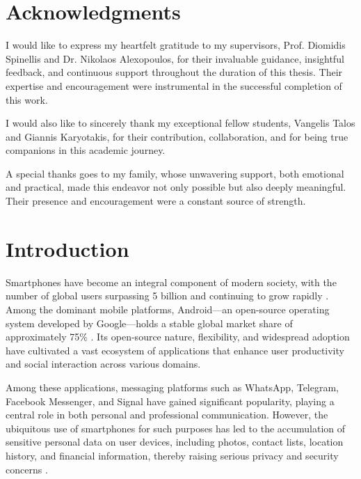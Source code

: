 \documentclass[a4paper,12pt]{report}
\begin{document}
\chapter*{Acknowledgments}

I would like to express my heartfelt gratitude to my supervisors, Prof. Diomidis Spinellis and Dr. Nikolaos Alexopoulos, for their invaluable guidance, insightful feedback, and continuous support throughout the duration of this thesis. Their expertise and encouragement were instrumental in the successful completion of this work.

I would also like to sincerely thank my exceptional fellow students, Vangelis Talos and Giannis Karyotakis, for their contribution, collaboration, and for being true companions in this academic journey.

A special thanks goes to my family, whose unwavering support, both emotional and practical, made this endeavor not only possible but also deeply meaningful. Their presence and encouragement were a constant source of strength.
\clearpage

\tableofcontents
\clearpage

\chapter{Introduction}

Smartphones have become an integral component of modern society, with the number of global users surpassing 5 billion and continuing to grow rapidly \cite{statista2024smartphone}. Among the dominant mobile platforms, Android—an open-source operating system developed by Google—holds a stable global market share of approximately 75\% \cite{statista2021android}. Its open-source nature, flexibility, and widespread adoption have cultivated a vast ecosystem of applications that enhance user productivity and social interaction across various domains.

Among these applications, messaging platforms such as WhatsApp, Telegram, Facebook Messenger, and Signal have gained significant popularity, playing a central role in both personal and professional communication. However, the ubiquitous use of smartphones for such purposes has led to the accumulation of sensitive personal data on user devices, including photos, contact lists, location history, and financial information, thereby raising serious privacy and security concerns \cite{verge2018facebooksms}.
\end{document}

